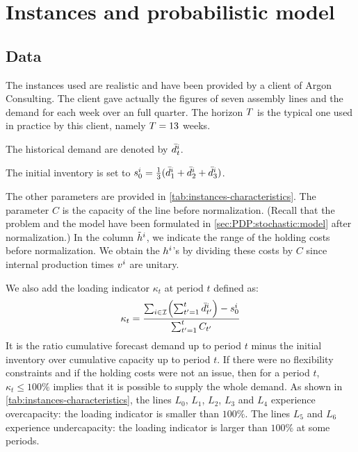 \section{Instances and probabilistic model}

\subsection{Data}
\label{sec:PDP:numerical-experiments:historical-data}

The instances used are realistic and have been provided by a client of Argon Consulting.
The client gave actually the figures of seven assembly lines and the demand for each week over an full quarter.
The horizon $T$ is the typical one used in practice by this client, namely $T=13$ weeks.

The historical demand are denoted by $\bar{d}_t^i$.

The initial inventory is set to $s_0^i=\frac{1}{3}(\bar{d}_1^i+\bar{d}_2^i+\bar{d}_3^i)$.

The other parameters are provided in \cref{tab:instances-characteristics}.
The parameter $C$ is the capacity of the line before normalization. (Recall that the problem and the model have been formulated in \cref{sec:PDP:stochastic:model} after normalization.)
In the column $\tilde{h}^i$, we indicate the range of the holding costs before normalization. We obtain the $h^i$'s by dividing these costs by $C$ since internal production times $v^i$ are unitary.

We also add the loading indicator $\kappa_t$ at period $t$ defined as:
\begin{equation}
  \kappa_t = \frac{\sum_{i\in\REF} \bracket{\sum_{t'=1}^{t} \bar{\demand}_{t'}^i}-\inventory_0^i}{ \sum_{t'=1}^{t} \capacity_{t'}}
\end{equation}
It is the ratio cumulative forecast demand up to period $t$ minus the initial inventory over cumulative capacity up to period $t$. If there were no flexibility constraints and if the holding costs were not an issue, then for a period $t$, $\kappa_t \le 100\%$ implies that it is possible to supply the whole demand. As shown in \cref{tab:instances-characteristics}, the lines $L_0$, $L_1$, $L_2$, $L_3$ and $L_4$ experience overcapacity: the loading indicator is smaller than $100\%$. The lines $L_5$ and $L_6$ experience undercapacity: the loading indicator is larger than $100\%$ at some periods.

